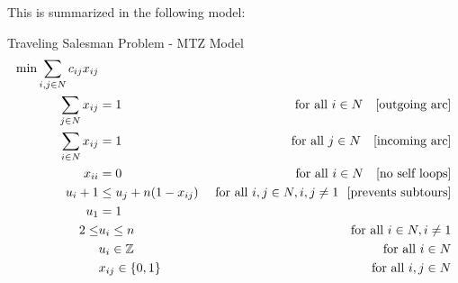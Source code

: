 \documentclass[../open-optimization/open-optimization.tex]{subfiles}
\begin{document}
This is summarized in the following model:
\begin{general}{Traveling Salesman Problem - MTZ Model}{}
\begin{align}
\min \sum_{i,j \in N} c_{ij} x_{ij}\\
\sum_{j\in N} x_{ij} &= 1 & \text{ for all } i \in N \ \ \text{ [outgoing arc]}\\
\sum_{i \in N} x_{ij} &= 1 & \text{ for all } j \in N \ \ \text{ [incoming arc]}\\
x_{ii} &= 0 & \text{ for all } i \in N \ \ \text{ [no self loops]} \\
u_i + 1 & \leq u_j + n(1-x_{ij})  & \text{ for all } i,j \in N, i,j \neq 1 \ \ \text{[prevents subtours]}\\
u_1 &= 1\\
2 \leq & u_i \leq n & \text{ for all } i \in N, i \neq 1\\
& u_i \in {\mathbb{Z}} & \text{ for all } i \in N\\
& x_{ij} \in \{0,1\} & \text{ for all } i,j \in N
\end{align}
\end{general}
\end{document}
